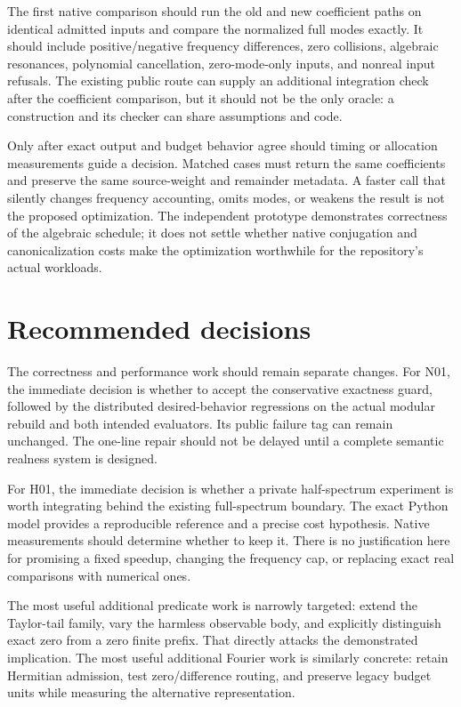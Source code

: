 \documentclass[11pt,letterpaper]{article}
\newcommand{\code}[1]{\texttt{\small\detokenize{#1}}}
\begin{document}
The first native comparison should run the old and new coefficient paths on identical admitted inputs and compare the normalized full modes exactly. It should include positive/negative frequency differences, zero collisions, algebraic resonances, polynomial cancellation, zero-mode-only inputs, and nonreal input refusals. The existing public \code{FourierInverseResidual} route can supply an additional integration check after the coefficient comparison, but it should not be the only oracle: a construction and its checker can share assumptions and code.

Only after exact output and budget behavior agree should timing or allocation measurements guide a decision. Matched cases must return the same coefficients and preserve the same source-weight and remainder metadata. A faster call that silently changes frequency accounting, omits modes, or weakens the result is not the proposed optimization. The independent prototype demonstrates correctness of the algebraic schedule; it does not settle whether native conjugation and canonicalization costs make the optimization worthwhile for the repository's actual workloads.

\section{Recommended decisions}
The correctness and performance work should remain separate changes. For N01, the immediate decision is whether to accept the conservative exactness guard, followed by the distributed desired-behavior regressions on the actual modular rebuild and both intended evaluators. Its public failure tag can remain unchanged. The one-line repair should not be delayed until a complete semantic realness system is designed.

For H01, the immediate decision is whether a private half-spectrum experiment is worth integrating behind the existing full-spectrum boundary. The exact Python model provides a reproducible reference and a precise cost hypothesis. Native measurements should determine whether to keep it. There is no justification here for promising a fixed speedup, changing the frequency cap, or replacing exact real comparisons with numerical ones.

The most useful additional predicate work is narrowly targeted: extend the Taylor-tail family, vary the harmless observable body, and explicitly distinguish exact zero from a zero finite prefix. That directly attacks the demonstrated implication. The most useful additional Fourier work is similarly concrete: retain Hermitian admission, test zero/difference routing, and preserve legacy budget units while measuring the alternative representation.
\end{document}
